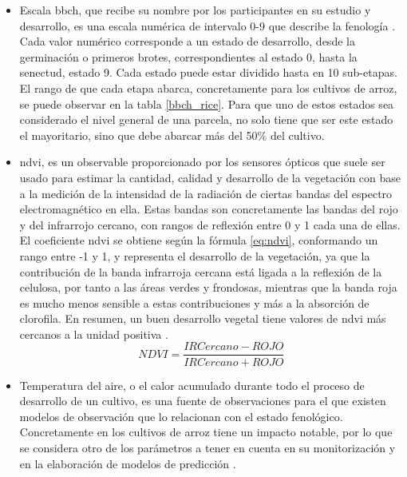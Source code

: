 \begin{itemize}
	\item Escala \gls{bbch}, que recibe su nombre por los participantes en su estudio y desarrollo, es una escala numérica de intervalo 0-9 que describe la fenología \cite{bbch}. Cada valor numérico corresponde a un estado de desarrollo, desde la germinación o primeros brotes, correspondientes al estado 0, hasta la senectud, estado 9. Cada estado puede estar dividido hasta en 10 sub-etapas. El rango de que cada etapa abarca, concretamente para los cultivos de arroz, se puede observar en la tabla \ref{bbch_rice}. Para que uno de estos estados sea considerado el nivel general de una parcela, no solo tiene que ser este estado el mayoritario, sino que debe abarcar más del 50\% del cultivo. 
	\item \gls{ndvi}, es un observable proporcionado por los sensores ópticos que suele ser usado para estimar la cantidad, calidad y desarrollo de la vegetación con base a la medición de la intensidad de la radiación de ciertas bandas del espectro electromagnético en ella. Estas bandas son concretamente las bandas del rojo y del infrarrojo cercano, con rangos de  reflexión entre 0 y 1 cada una de ellas. El coeficiente \gls{ndvi} se obtiene según la fórmula \ref{eq:ndvi}, conformando un rango entre -1 y 1, y representa el desarrollo de la vegetación, ya que la contribución de la banda infrarroja cercana está ligada a la reflexión de la celulosa, por tanto a las áreas verdes y frondosas, mientras que la banda roja es mucho menos sensible a estas contribuciones y más a la absorción de clorofila. En resumen, un buen desarrollo vegetal tiene valores de \gls{ndvi} más cercanos a la unidad positiva \citep{ndvi}. 
	\begin{equation} \label{eq:ndvi}
		NDVI = \frac{IRCercano-ROJO}{IRCercano+ROJO}
	\end{equation}
	\item Temperatura del aire, o el calor acumulado durante todo el proceso de desarrollo de un cultivo, es una fuente de observaciones para el que existen modelos de observación que lo relacionan con el estado fenológico. Concretamente en los cultivos de arroz tiene un impacto notable, por lo que se considera otro de los parámetros a tener en cuenta en su monitorización y en la elaboración de modelos de predicción \cite{Juanma2016}.
\end{itemize} 

